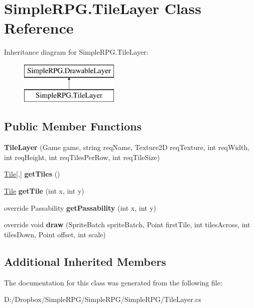 \hypertarget{class_simple_r_p_g_1_1_tile_layer}{\section{Simple\+R\+P\+G.\+Tile\+Layer Class Reference}
\label{class_simple_r_p_g_1_1_tile_layer}
}
Inheritance diagram for Simple\+R\+P\+G.\+Tile\+Layer\+:\begin{figure}[H]
\begin{center}
\leavevmode
\includegraphics[height=2.000000cm]{class_simple_r_p_g_1_1_tile_layer}
\end{center}
\end{figure}
\subsection*{Public Member Functions}
\begin{DoxyCompactItemize}
\item 
\hypertarget{class_simple_r_p_g_1_1_tile_layer_ace9183fa596c86f2df4a83014ca950f0}{{\bfseries Tile\+Layer} (Game game, string req\+Name, Texture2\+D req\+Texture, int req\+Width, int req\+Height, int req\+Tiles\+Per\+Row, int req\+Tile\+Size)}\label{class_simple_r_p_g_1_1_tile_layer_ace9183fa596c86f2df4a83014ca950f0}

\item 
\hypertarget{class_simple_r_p_g_1_1_tile_layer_a7cc0ae37cfbbc7dc82615bc6c63bf020}{\hyperlink{class_simple_r_p_g_1_1_tile}{Tile}\mbox{[},\mbox{]} {\bfseries get\+Tiles} ()}\label{class_simple_r_p_g_1_1_tile_layer_a7cc0ae37cfbbc7dc82615bc6c63bf020}

\item 
\hypertarget{class_simple_r_p_g_1_1_tile_layer_a8cac5f0cde30090519d897e526a3f57e}{\hyperlink{class_simple_r_p_g_1_1_tile}{Tile} {\bfseries get\+Tile} (int x, int y)}\label{class_simple_r_p_g_1_1_tile_layer_a8cac5f0cde30090519d897e526a3f57e}

\item 
\hypertarget{class_simple_r_p_g_1_1_tile_layer_a5e79fc6d88c3e907eedad7737c9c4e7e}{override Passability {\bfseries get\+Passability} (int x, int y)}\label{class_simple_r_p_g_1_1_tile_layer_a5e79fc6d88c3e907eedad7737c9c4e7e}

\item 
\hypertarget{class_simple_r_p_g_1_1_tile_layer_a559edc2f802575814d4e3d762023b878}{override void {\bfseries draw} (Sprite\+Batch sprite\+Batch, Point first\+Tile, int tiles\+Across, int tiles\+Down, Point offset, int scale)}\label{class_simple_r_p_g_1_1_tile_layer_a559edc2f802575814d4e3d762023b878}

\end{DoxyCompactItemize}
\subsection*{Additional Inherited Members}


The documentation for this class was generated from the following file\+:\begin{DoxyCompactItemize}
\item 
D\+:/\+Dropbox/\+Simple\+R\+P\+G/\+Simple\+R\+P\+G/\+Simple\+R\+P\+G/Tile\+Layer.\+cs\end{DoxyCompactItemize}
